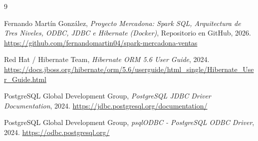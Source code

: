 \documentclass[a4paper,12pt]{article}
\begin{document}
\begin{thebibliography}{9}

Fernando Martín González,
\textit{Proyecto Mercadona: Spark SQL, Arquitectura de Tres Niveles, ODBC, JDBC e Hibernate (Docker)},
Repositorio en GitHub, 2026.
\url{https://github.com/fernandomartin04/spark-mercadona-ventas}

Red Hat / Hibernate Team,
\textit{Hibernate ORM 5.6 User Guide},
2024.
\url{https://docs.jboss.org/hibernate/orm/5.6/userguide/html_single/Hibernate_User_Guide.html}

PostgreSQL Global Development Group,
\textit{PostgreSQL JDBC Driver Documentation},
2024.
\url{https://jdbc.postgresql.org/documentation/}

PostgreSQL Global Development Group,
\textit{psqlODBC - PostgreSQL ODBC Driver},
2024.
\url{https://odbc.postgresql.org/}

\end{thebibliography}
\end{document}
